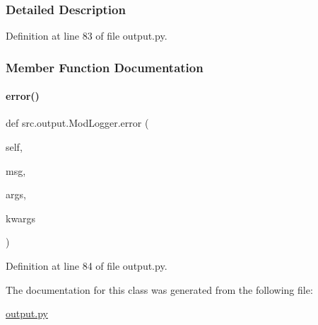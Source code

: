 \subsubsection{Detailed Description}


Definition at line 83 of file output.\+py.



\subsubsection{Member Function Documentation}
\mbox{\label{classsrc_1_1output_1_1ModLogger_a4ae03cf66a4295583f1066e7ec114ecb}} 
\paragraph{\texorpdfstring{error()}{error()}}
{\footnotesize\ttfamily def src.\+output.\+Mod\+Logger.\+error (\begin{DoxyParamCaption}\item[{}]{self,  }\item[{}]{msg,  }\item[{}]{args,  }\item[{}]{kwargs }\end{DoxyParamCaption})}



Definition at line 84 of file output.\+py.



The documentation for this class was generated from the following file\+:\begin{DoxyCompactItemize}
\item 
\hyperlink{output_8py}{output.\+py}\end{DoxyCompactItemize}
